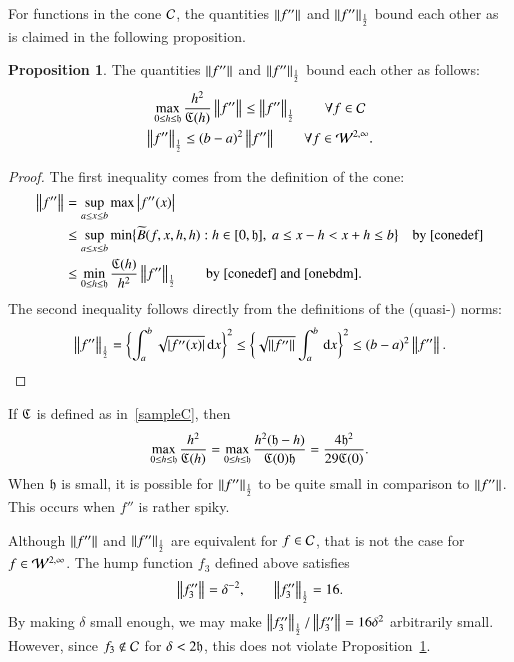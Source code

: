 \documentclass[review]{elsarticle}
\theoremstyle{definition}
\newtheorem{prop}[theorem]{Proposition}
\begin{document}
For functions in the cone $\cc$, the quantities $\norm{f''}$ and $\norm[\frac 12]{f''}$ bound each other as is claimed in the following proposition.

\begin{prop} \label{equivnormprop} The quantities $\norm{f''}$ and $\norm[\frac 12]{f''}$ bound each other as follows:
	\begin{subequations}
		\begin{gather}
		\label{inflesshalf}
		\max_{0 \le h \le \fh} \frac{h^2}{\fC(h)} \norm{f''} \le \norm[\frac 12]{f''} \qquad \forall f \in \cc \\
		\label{halflessinf}
		\norm[\frac 12]{f''}  \le (b-a)^2 \norm{f''} \qquad \forall f \in \cw^{2,\infty}.
		\end{gather}
	\end{subequations}
\end{prop}
\begin{proof}
The first inequality comes from the definition of the cone:
\begin{align*}
\norm{f''} & = \sup_{a \le x \le b} \max \abs{f''(x)} \\
& \le \sup_{a \le x \le b} \min\bigl\{\tB(f,x,h,h) : h \in [0,\fh], \ a \le x - h < x+h \le b \bigr \} \quad \text{by}~\eqref{conedef} \\
& \le \min_{0 \le h \le \fh} \frac{\fC(h)}{h^2}\norm[\frac 12]{f''} \qquad \text{by}~\eqref{conedef} \text{ and}~\eqref{onebdm}.
\end{align*}
The second inequality follows directly from the definitions of the (quasi-) norms:
\begin{equation} \label{onebdm}
\norm[\frac 12]{f''} = \biggl\{ \int_{a}^{b} \sqrt{\abs{f''(x)}} \, \dif x \biggr\}^2 \le\biggl\{\sqrt{\norm{f''}}  \int_{a}^{b} \, \dif x \biggr\}^2 \le  (b - a)^2 \norm{f''}.
\end{equation}
\end{proof}

If $\fC$ is defined as in~\eqref{sampleC}, then
\[
\max_{0 \le h \le \fh} \frac{h^2}{\fC(h)} = \max_{0 \le h \le \fh} \frac{h^2(\fh - h)}{\fC(0)\fh} = \frac{4\fh^2}{29\fC(0)}.
\]
When $\fh$ is small, it is possible for $\norm[\frac 12]{f''} $ to be quite small in comparison to $\norm{f''}$.  This occurs when $f''$ is rather spiky.


Although $\norm{f''}$ and $\norm[\frac 12]{f''} $ are equivalent for $f \in \cc$, that is not the case for $f \in \cw^{2,\infty}$.  The hump function $f_3$ defined above satisfies
\[
\norm{f_3''} = \delta^{-2}, \qquad \norm[\frac 12]{f_3''}  = 16.
\]
By making $\delta$ small enough, we may make $\norm[\frac 12]{f_3''}/\norm{f_3''} = 16\delta^2$ arbitrarily small.  However, since $f_3 \notin \cc$ for $\delta < 2\fh$, this does not violate Proposition~\ref{equivnormprop}.
\end{document}

